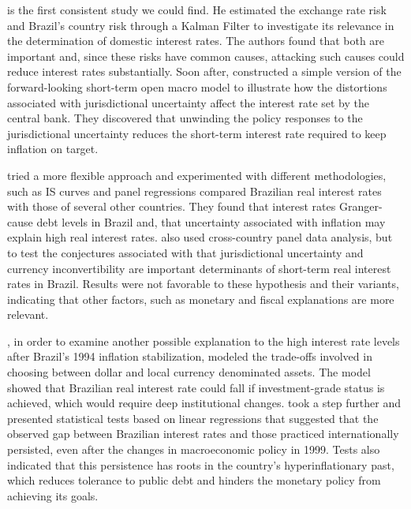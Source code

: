 \documentclass[11pt,]{article}
\begin{document}
\citet{garcia} is the first consistent study we could find. He estimated
the exchange rate risk and Brazil's country risk through a Kalman Filter
to investigate its relevance in the determination of domestic interest
rates. The authors found that both are important and, since these risks
have common causes, attacking such causes could reduce interest rates
substantially. Soon after, \citet{arida} constructed a simple version of
the forward-looking short-term open macro model to illustrate how the
distortions associated with jurisdictional uncertainty affect the
interest rate set by the central bank. They discovered that unwinding
the policy responses to the jurisdictional uncertainty reduces the
short-term interest rate required to keep inflation on target.

\citet{muinhos} tried a more flexible approach and experimented with
different methodologies, such as IS curves and panel regressions
compared Brazilian real interest rates with those of several other
countries. They found that interest rates Granger-cause debt levels in
Brazil and, that uncertainty associated with inflation may explain high
real interest rates.\citet{goncalves} also used cross-country panel data
analysis, but to test the conjectures associated with \citet{arida} that
jurisdictional uncertainty and currency inconvertibility are important
determinants of short-term real interest rates in Brazil. Results were
not favorable to these hypothesis and their variants, indicating that
other factors, such as monetary and fiscal explanations are more
relevant.

\citet{bacha1}, in order to examine another possible explanation to the
high interest rate levels after Brazil's 1994 inflation stabilization,
modeled the trade-offs involved in choosing between dollar and local
currency denominated assets. The model showed that Brazilian real
interest rate could fall if investment-grade status is achieved, which
would require deep institutional changes. \citet{bacha2} took a step
further and presented statistical tests based on linear regressions that
suggested that the observed gap between Brazilian interest rates and
those practiced internationally persisted, even after the changes in
macroeconomic policy in 1999. Tests also indicated that this persistence
has roots in the country's hyperinflationary past, which reduces
tolerance to public debt and hinders the monetary policy from achieving
its goals.
\end{document}

